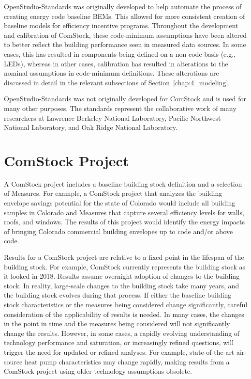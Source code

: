 OpenStudio-Standards was originally developed to help automate the process of creating energy code baseline BEMs. This allowed for more consistent creation of baseline models for efficiency incentive programs. Throughout the development and calibration of ComStock, these code-minimum assumptions have been altered to better reflect the building performance seen in measured data sources. In some cases, this has resulted in components being defined on a non-code basis (e.g., LEDs), whereas in other cases, calibration has resulted in alterations to the nominal assumptions in code-minimum definitions. These alterations are discussed in detail in the relevant subsections of Section~\ref{chap:4_modeling}.

OpenStudio-Standards was not originally developed for ComStock and is used for many other purposes. The standards represent the collaborative work of many researchers at Lawrence Berkeley National Laboratory, Pacific Northwest National Laboratory, and Oak Ridge National Laboratory.

\section{ComStock Project}

A ComStock project includes a baseline building stock definition and a selection of Measures. For example, a ComStock project that analyzes the building envelope savings potential for the state of Colorado would include all building samples in Colorado and Measures that capture several efficiency levels for walls, roofs, and windows. The results of this project would identify the energy impacts of bringing Colorado commercial building envelopes up to code and/or above code.

Results for a ComStock project are relative to a fixed point in the lifespan of the building stock. For example, ComStock currently represents the building stock as it looked in 2018. Results assume overnight adoption of changes to the building stock. In reality, large-scale changes to the building stock take many years, and the building stock evolves during that process. If either the baseline building stock characteristics or the measures being considered change significantly, careful consideration of the applicability of results is needed. In many cases, the changes in the point in time and the measures being considered will not significantly change the results. However, in some cases, a rapidly evolving understanding of technology performance and saturation, or increasingly refined questions, will trigger the need for updated or refined analyses. For example, state-of-the-art air-source heat pump characteristics may change rapidly, making results from a ComStock project using older technology assumptions obsolete.

